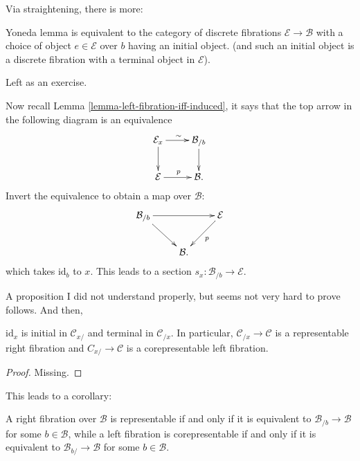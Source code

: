 \noindent
Via straightening, there is more:

\begin{lemma}
\label{lemma-yoneda-equivalence-fibrations}
Yoneda lemma is equivalent
to the category of discrete fibrations $\mathcal{E} \to \mathcal{B}$ 
with a choice of object $e \in \mathcal{E}$ over $b$
having an initial object.
(and such an initial object is a discrete fibration
with a terminal object in $\mathcal{E}$).
\end{lemma}

Left as an exercise.


\medskip\noindent
Now recall Lemma \ref{lemma-left-fibration-iff-induced},
it says that the top arrow in the following diagram
is an equivalence
$$
\xymatrix{
\mathcal{E}_x\ar[r]^\sim\ar[d]&\mathcal{B}_{/b}\ar[d]\\
\mathcal{E}\ar[r]^p&\mathcal{B}.
}
$$
Invert the equivalence to obtain a map over $\mathcal{B}$:
$$
\xymatrix{
\mathcal{B}_{/b} \ar[rd] \ar[rr] && \mathcal{E} \ar[dl]^{p} \\
& \mathcal{B}.
}
$$
which takes $\text{id}_b$ to $x$.
This leads to a section $s_x:\mathcal{B}_{/b}\to \mathcal{E}$.

\medskip\noindent
A proposition I did not understand properly,
but seems not very hard to prove follows. And then,

\begin{proposition}
\label{proposition-maps-over-x-are-representable}
$\text{id}_x$ is initial in $\mathcal{C}_{x/}$ 
and terminal in $\mathcal{C}_{/x}$.
In particular, $\mathcal{C}_{/x}\to \mathcal{C}$ 
is a representable right fibration
and $C_{x/}\to \mathcal{C}$ is a corepresentable left fibration.
\end{proposition} 

\begin{proof}
Missing.
\end{proof}

\noindent
This leads to a corollary:

\begin{lemma}
\label{lemma-fibration-equivalent-iff-is-maps-over-b-fibration}
A right fibration over $\mathcal{B}$ is representable
if and only if it is equivalent to $\mathcal{B}_{/b}\to \mathcal{B}$ 
for some $b \in \mathcal{B}$,
while a left fibration is corepresentable if and only if
it is equivalent to $\mathcal{B}_{b/}\to \mathcal{B}$ 
for some $b \in \mathcal{B}$.
\end{lemma}





